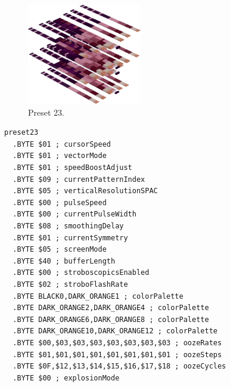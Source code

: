 \vspace*{-0.5cm}
\begin{minipage}[b]{0.48\linewidth}
\begin{figure}[H]                                                          
  \centering                                                             
  \begin{adjustbox}{width=5cm,center}                                   
  \includegraphics[width=5cm]{src/colorspace_presets/preset23-45.png}%
  \end{adjustbox}                                                        
\caption*{Preset 23.}                                           
\end{figure}                                                               
\end{minipage}
\hspace{0.1cm}
\begin{minipage}[b]{0.48\linewidth}                                                                         
\begin{lstlisting}[basicstyle=\ttfamily\tiny]
preset23
  .BYTE $01 ; cursorSpeed
  .BYTE $01 ; vectorMode
  .BYTE $01 ; speedBoostAdjust
  .BYTE $09 ; currentPatternIndex
  .BYTE $05 ; verticalResolutionSPAC
  .BYTE $00 ; pulseSpeed
  .BYTE $00 ; currentPulseWidth
  .BYTE $08 ; smoothingDelay
  .BYTE $01 ; currentSymmetry
  .BYTE $05 ; screenMode
  .BYTE $40 ; bufferLength
  .BYTE $00 ; stroboscopicsEnabled
  .BYTE $02 ; stroboFlashRate
  .BYTE BLACK0,DARK_ORANGE1 ; colorPalette
  .BYTE DARK_ORANGE2,DARK_ORANGE4 ; colorPalette
  .BYTE DARK_ORANGE6,DARK_ORANGE8 ; colorPalette
  .BYTE DARK_ORANGE10,DARK_ORANGE12 ; colorPalette
  .BYTE $00,$03,$03,$03,$03,$03,$03,$03 ; oozeRates
  .BYTE $01,$01,$01,$01,$01,$01,$01,$01 ; oozeSteps
  .BYTE $0F,$12,$13,$14,$15,$16,$17,$18 ; oozeCycles
  .BYTE $00 ; explosionMode
\end{lstlisting}
\end{minipage}


